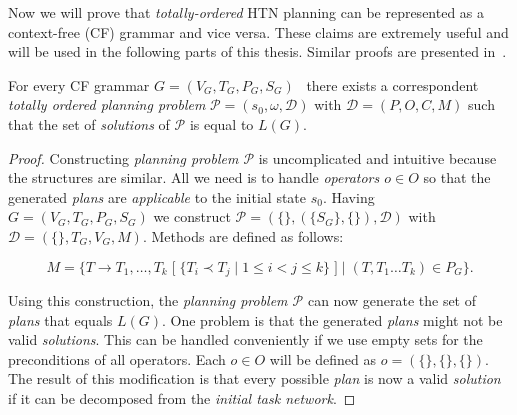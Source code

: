 \medskip\noindent
Now we will prove that \emph{totally-ordered} HTN planning can be represented as a context-free (CF) grammar and vice versa. These claims are extremely useful and will be used in the following parts of this thesis. Similar proofs are presented in~\cite{langclassification}.

\begin{thm}\label{thm02:3}
    For every CF grammar $G = (V_G, T_G, P_G, S_G)$~\cite{chytil} there exists a correspondent \emph{totally ordered planning problem} $\mathcal{P} = (s_0,\omega,\mathcal{D})$ with $\mathcal{D}=(P, O, C, M)$ such that the set of \emph{solutions} of $\mathcal{P}$ is equal to $L(G)$.
\end{thm}
\begin{proof}
    Constructing \emph{planning problem $\mathcal{P}$} is uncomplicated and intuitive because the structures are similar. All we need is to handle \emph{operators $o \in O$} so that the generated \emph{plans} are \emph{applicable} to the initial state $s_0$. Having $G = (V_G,T_G,P_G,S_G)$ we construct $\mathcal{P} = (\{\}, (\{S_G\}, \{\}), \mathcal{D})$ with $\mathcal{D} = (\{\},T_G,V_G,M)$. Methods are defined as follows:
    
    \[
    M = \{T \rightarrow T_1,\dots,T_k \; [ \; \{T_i \prec T_j \; | \; 1 \leq i < j \leq k\} \; ] \; | \; (T,T_1 \dots T_k) \in P_G\}.
    \]
    
    Using this construction, the \emph{planning problem $\mathcal{P}$} can now generate the set of \emph{plans} that equals $L(G)$. One problem is that the generated \emph{plans} might not be valid \emph{solutions}. This can be handled conveniently if we use empty sets for the preconditions of all operators. Each $o \in O$ will be defined as $o = (\{\}, \{\}, \{\})$. The result of this modification is that every possible \emph{plan} is now a valid \emph{solution} if it can be decomposed from the \emph{initial task network}.
\end{proof}

